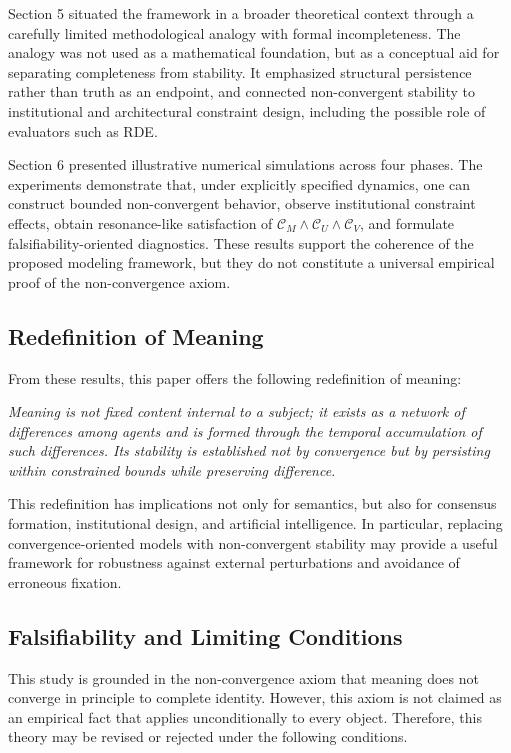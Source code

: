 \documentclass[11pt,a4paper]{article}
\theoremstyle{definition}
\begin{document}
Section 5 situated the framework in a broader theoretical context through a carefully limited methodological analogy with formal incompleteness. The analogy was not used as a mathematical foundation, but as a conceptual aid for separating completeness from stability. It emphasized structural persistence rather than truth as an endpoint, and connected non-convergent stability to institutional and architectural constraint design, including the possible role of evaluators such as RDE.

Section 6 presented illustrative numerical simulations across four phases. The experiments demonstrate that, under explicitly specified dynamics, one can construct bounded non-convergent behavior, observe institutional constraint effects, obtain resonance-like satisfaction of $\mathcal{C}_M \land \mathcal{C}_U \land \mathcal{C}_V$, and formulate falsifiability-oriented diagnostics. These results support the coherence of the proposed modeling framework, but they do not constitute a universal empirical proof of the non-convergence axiom.

\subsection{Redefinition of Meaning}

From these results, this paper offers the following redefinition of meaning:

\textit{Meaning is not fixed content internal to a subject; it exists as a network of differences among agents and is formed through the temporal accumulation of such differences. Its stability is established not by convergence but by persisting within constrained bounds while preserving difference.}

This redefinition has implications not only for semantics, but also for consensus formation, institutional design, and artificial intelligence. In particular, replacing convergence-oriented models with non-convergent stability may provide a useful framework for robustness against external perturbations and avoidance of erroneous fixation.

\subsection{Falsifiability and Limiting Conditions}

This study is grounded in the non-convergence axiom that meaning does not converge in principle to complete identity. However, this axiom is not claimed as an empirical fact that applies unconditionally to every object. Therefore, this theory may be revised or rejected under the following conditions.
\end{document}
